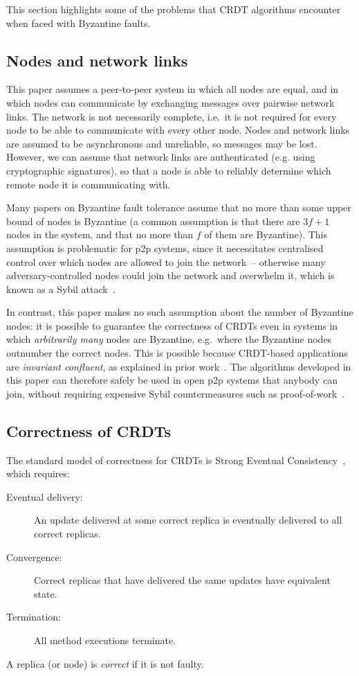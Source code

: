 \documentclass[sigplan,review]{acmart}
\begin{document}
This section highlights some of the problems that CRDT algorithms encounter when faced with Byzantine faults.

\subsection{Nodes and network links}

This paper assumes a peer-to-peer system in which all nodes are equal, and in which nodes can communicate by exchanging messages over pairwise network links.
The network is not necessarily complete, i.e.\ it is not required for every node to be able to communicate with every other node.
Nodes and network links are assumed to be asynchronous and unreliable, so messages may be lost.
However, we can assume that network links are authenticated (e.g. using cryptographic signatures), so that a node is able to reliably determine which remote node it is communicating with.

Many papers on Byzantine fault tolerance assume that no more than some upper bound of nodes is Byzantine (a common assumption is that there are $3f+1$ nodes in the system, and that no more than $f$ of them are Byzantine).
This assumption is problematic for p2p systems, since it necessitates centralised control over which nodes are allowed to join the network~-- otherwise many adversary-controlled nodes could join the network and overwhelm it, which is known as a Sybil attack~\cite{Douceur:2002}.

In contrast, this paper makes no such assumption about the number of Byzantine nodes: it is possible to guarantee the correctness of CRDTs even in systems in which \emph{arbitrarily many} nodes are Byzantine, e.g.\ where the Byzantine nodes outnumber the correct nodes.
This is possible because CRDT-based applications are \emph{invariant confluent}, as explained in prior work~\cite{BECPreprint}.
The algorithms developed in this paper can therefore safely be used in open p2p systems that anybody can join, without requiring expensive Sybil countermeasures such as proof-of-work~\cite{Nakamoto:2008}.

\subsection{Correctness of CRDTs}

The standard model of correctness for CRDTs is Strong Eventual Consistency~\cite{Shapiro:2011,Gomes:2017gy}, which requires:
\begin{description}
\item[Eventual delivery:] An update delivered at some correct replica is eventually delivered to all correct replicas.
\item[Convergence:] Correct replicas that have delivered the same updates have equivalent state.
\item[Termination:] All method executions terminate.
\end{description}
A replica (or node) is \emph{correct} if it is not faulty.
\end{document}
